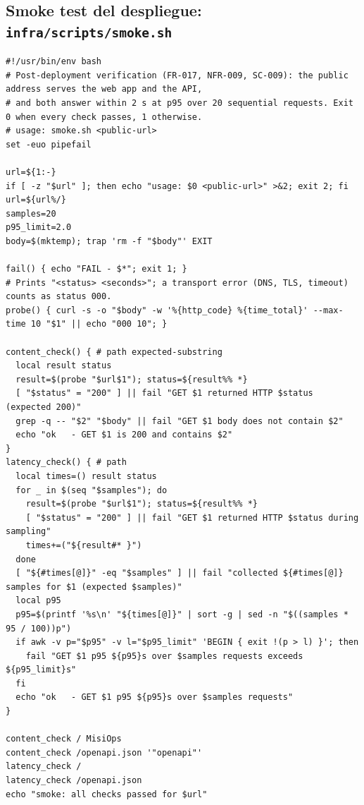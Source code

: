 \subsection{Smoke test del despliegue: \texttt{infra/scripts/smoke.sh}}
\label{anx:smoke}

\begin{lstlisting}
#!/usr/bin/env bash
# Post-deployment verification (FR-017, NFR-009, SC-009): the public address serves the web app and the API,
# and both answer within 2 s at p95 over 20 sequential requests. Exit 0 when every check passes, 1 otherwise.
# usage: smoke.sh <public-url>
set -euo pipefail

url=${1:-}
if [ -z "$url" ]; then echo "usage: $0 <public-url>" >&2; exit 2; fi
url=${url%/}
samples=20
p95_limit=2.0
body=$(mktemp); trap 'rm -f "$body"' EXIT

fail() { echo "FAIL - $*"; exit 1; }
# Prints "<status> <seconds>"; a transport error (DNS, TLS, timeout) counts as status 000.
probe() { curl -s -o "$body" -w '%{http_code} %{time_total}' --max-time 10 "$1" || echo "000 10"; }

content_check() { # path expected-substring
  local result status
  result=$(probe "$url$1"); status=${result%% *}
  [ "$status" = "200" ] || fail "GET $1 returned HTTP $status (expected 200)"
  grep -q -- "$2" "$body" || fail "GET $1 body does not contain $2"
  echo "ok   - GET $1 is 200 and contains $2"
}
latency_check() { # path
  local times=() result status
  for _ in $(seq "$samples"); do
    result=$(probe "$url$1"); status=${result%% *}
    [ "$status" = "200" ] || fail "GET $1 returned HTTP $status during sampling"
    times+=("${result#* }")
  done
  [ "${#times[@]}" -eq "$samples" ] || fail "collected ${#times[@]} samples for $1 (expected $samples)"
  local p95
  p95=$(printf '%s\n' "${times[@]}" | sort -g | sed -n "$((samples * 95 / 100))p")
  if awk -v p="$p95" -v l="$p95_limit" 'BEGIN { exit !(p > l) }'; then
    fail "GET $1 p95 ${p95}s over $samples requests exceeds ${p95_limit}s"
  fi
  echo "ok   - GET $1 p95 ${p95}s over $samples requests"
}

content_check / MisiOps
content_check /openapi.json '"openapi"'
latency_check /
latency_check /openapi.json
echo "smoke: all checks passed for $url"
\end{lstlisting}
